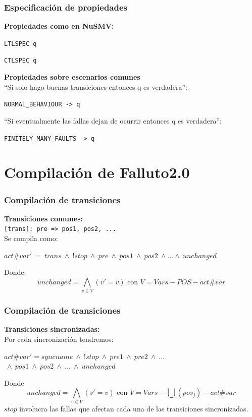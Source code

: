 \documentclass[serif]{beamer}
\begin{document}
\begin{frame}
\frametitle{Especificación de propiedades}
\textbf{Propiedades como en NuSMV:}\\[0.3cm]
\begin{center}\texttt{LTLSPEC q}

\texttt{CTLSPEC q}\end{center}
\textbf{Propiedades sobre escenarios comunes}\\[0.3cm]
``Si solo hago buenas transiciones entonces q es verdadera'':\\[0.2cm]
\begin{center} \texttt{NORMAL\_BEHAVIOUR -> q}\end{center}
``Si eventualmente las fallas dejan de ocurrir entonces q es
verdadera'':\\[0.2cm]
\begin{center} \texttt{FINITELY\_MANY\_FAULTS -> q}\end{center}
\end{frame}


\section[Compilaci\'on]{Compilación de Falluto2.0}


\begin{frame}
\frametitle{Compilación de transiciones}
\textbf{\Large Transiciones comunes:}\\[0.3cm]
\texttt{[trans]: pre => pos1, pos2, ...}\\[0.3cm]
Se compila como:
\begin{framed}
$act\#var'~=~trans~\wedge~!stop~\wedge~pre~\wedge~pos1~\wedge~pos2~\wedge...\wedge~unchanged$
\end{framed}
Donde:
$$unchanged = \bigwedge_{v\in V}(v' = v) \text{ con }V = Vars - POS - act\#var$$

\end{frame}


\begin{frame}
\frametitle{Compilación de transiciones}
\textbf{\Large Transiciones sincronizadas:}\\[0.3cm]
Por cada sincronizaci\'on tendremos:
\begin{framed}
$act\#var' = syncname~\wedge~!stop~\wedge~pre1~\wedge~pre2~\wedge~...$
$~\wedge~pos1~\wedge~pos2~\wedge~...~\wedge~unchanged$\\[0.3cm]
\end{framed}
Donde
$$unchanged = \bigwedge_{v \in V}(v' = v) \text{ con }V = Vars 
- \bigcup (pos_j) - act\#var$$
$stop$ involucra las fallas que afectan cada una de las 
transiciones sincronizadas.
\end{frame}
\end{document}
